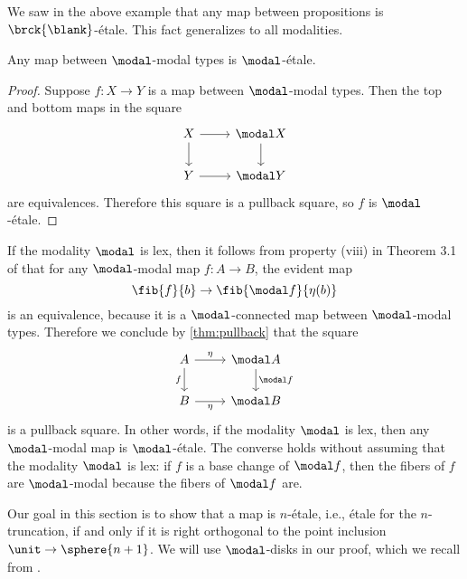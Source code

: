 \documentclass{msc}
\begin{document}
We saw in the above example that any map between propositions is $\brck{\blank}$-\'etale. This fact generalizes to all modalities.

\begin{lem}\label{lem:etale_modal}
Any map between $\modal$-modal types is $\modal$-\'etale.
\end{lem}

\begin{proof}
Suppose $f:X\to Y$ is a map between $\modal$-modal types. Then the top and bottom maps in the square
\begin{equation*}
\begin{tikzcd}
X \arrow[r] \arrow[d] & \modal X \arrow[d] \\
Y \arrow[r] & \modal Y
\end{tikzcd}
\end{equation*}
are equivalences. Therefore this square is a pullback square, so $f$ is $\modal$-\'etale.
\end{proof}

\begin{rmk}
  If the modality $\modal$ is lex, then it follows from property (viii) in Theorem 3.1 of \cite{RijkeSpittersShulman} that for any $\modal$-modal map $f:A\to B$, the evident map
  \begin{equation*}
    \fib{f}{b}\to\fib{\modal f}{\eta(b)}
  \end{equation*}
  is an equivalence, because it is a $\modal$-connected map between $\modal$-modal types. Therefore we conclude by \cref{thm:pullback} that the square
  \begin{equation*}
    \begin{tikzcd}
      A \arrow[d,swap,"f"] \arrow[r,"\eta"] & \modal A \arrow[d,"\modal f"] \\
      B \arrow[r,swap,"\eta"] & \modal B
    \end{tikzcd}
  \end{equation*}
  is a pullback square. In other words, if the modality $\modal$ is lex, then any $\modal$-modal map is $\modal$-\'etale. The converse holds without assuming that the modality $\modal$ is lex: if $f$ is a base change of $\modal f$, then the fibers of $f$ are $\modal$-modal because the fibers of $\modal f$ are.
\end{rmk}

Our goal in this section is to show that a map is $n$-\'etale, i.e., \'etale for the $n$-truncation, if and only if it is right orthogonal to the point inclusion $\unit\to\sphere{n+1}$. We will use $\modal$-disks in our proof, which we recall from \cite{wellen-thesis}.
\end{document}

